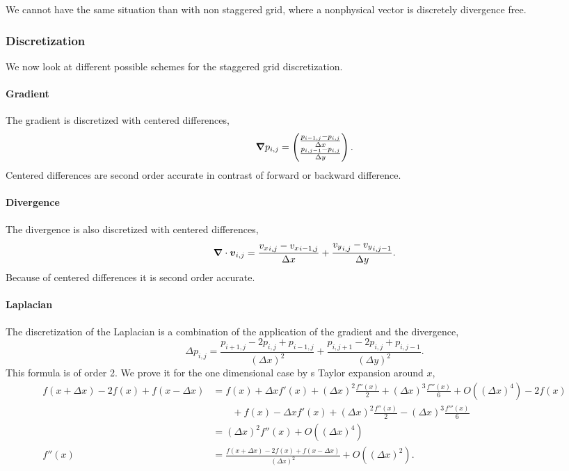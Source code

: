 We cannot have the same situation than with non staggered grid, where a nonphysical vector is discretely divergence free.

\subsubsection{Discretization}

We now look at different possible schemes for the staggered grid discretization.

\paragraph{Gradient}
\label{fixed:gradient}

The gradient is discretized with centered differences,
\begin{equation}
  {\boldsymbol {\nabla}}p_{i,j}=\begin{pmatrix}
                       	\frac{p_{i-1,j}-p_{i,j}}{\Delta x}\\
                       	\frac{p_{i,j-1}-p_{i,j}}{\Delta y}\\
                       \end{pmatrix}.
\end{equation}
Centered differences are second order accurate in contrast of forward or backward difference.

\paragraph{Divergence}
\label{fixed:divergence}

The divergence is also discretized with centered differences,
\begin{equation}
	{\boldsymbol {\nabla}}\cdot {\boldsymbol {v}}_{i,j}=\frac{{v_{x}}_{i,j}-{v_{x}}_{i-1,j}}{\Delta x}+\frac{{v_{y}}_{i,j}-{v_{y}}_{i,j-1}}{\Delta y}.
\end{equation}
Because of centered differences it is second order accurate.

\paragraph{Laplacian}
\label{fixed:Laplacian}

The discretization of the Laplacian is a combination of the application of the gradient and the divergence,
\begin{equation}
  \Delta p_{i,j}=\frac{p_{i+1,j}-2p_{i,j}+p_{i-1,j}}{(\Delta x)^2}+\frac{p_{i,j+1}-2p_{i,j}+p_{i,j-1}}{(\Delta y)^2}.
\end{equation}
This formula is of order 2.
We prove it for the one dimensional case by s Taylor expansion around $x$,
\begin{align*}
  f(x+\Delta x)-2f(x)+f(x-\Delta x)
  &=f(x)+\Delta x f'(x) +(\Delta x)^2 \frac{f''(x)}{2}+(\Delta x)^3 \frac{f'''(x)}{6}+O((\Delta x)^4)-2f(x)\\
  &\qquad+f(x)-\Delta x f'(x) +(\Delta x)^2 \frac{f''(x)}{2}-(\Delta x)^3 \frac{f'''(x)}{6}\\
  &=(\Delta x)^2f''(x) +O((\Delta x)^4)\\
  f''(x)&=\frac{f(x+\Delta x)-2f(x)+f(x-\Delta x)}{(\Delta x)^2}+O((\Delta x)^2).
\end{align*}

